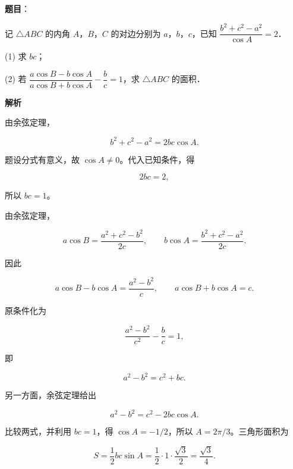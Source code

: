 \begin{answer}

\textbf{题目}：

记 $\triangle ABC$ 的内角 $A$，$B$，$C$ 的对边分别为 $a$，$b$，$c$，已知 $\dfrac{b^2+c^2-a^2}{\cos A}=2$．

  (1) 求 $bc$；

  (2) 若 $\dfrac{a\cos B-b\cos A}{a\cos B+b\cos A}-\dfrac bc=1$，求 $\triangle ABC$ 的面积．

\textbf{解析}


由余弦定理，

\nopagebreak[4]
\[
b^2+c^2-a^2=2bc\cos A.
\]

题设分式有意义，故 $\cos A\ne0$。代入已知条件，得

\nopagebreak[4]
\[
2bc=2,
\]

所以 $bc=1$。


由余弦定理，

\nopagebreak[4]
\[
a\cos B=\frac{a^2+c^2-b^2}{2c},\qquad
b\cos A=\frac{b^2+c^2-a^2}{2c}.
\]

因此

\nopagebreak[4]
\[
a\cos B-b\cos A=\frac{a^2-b^2}{c},\qquad
a\cos B+b\cos A=c.
\]

原条件化为

\nopagebreak[4]
\[
\frac{a^2-b^2}{c^2}-\frac bc=1,
\]

即

\nopagebreak[4]
\[
a^2-b^2=c^2+bc.
\]

另一方面，余弦定理给出

\nopagebreak[4]
\[
a^2-b^2=c^2-2bc\cos A.
\]

比较两式，并利用 $bc=1$，得 $\cos A=-1/2$，所以 $A=2\pi/3$。三角形面积为

\nopagebreak[4]
\[
S=\frac12bc\sin A
=\frac12\cdot1\cdot\frac{\sqrt3}{2}
=\frac{\sqrt3}{4}.
\]



\end{answer}
